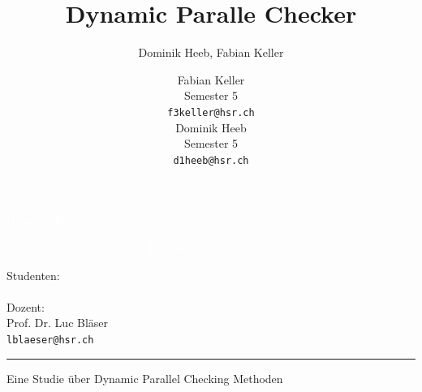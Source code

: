 \documentclass[10pt,a4paper]{article}
\author{Dominik Heeb, Fabian Keller}
\title{Dynamic Paralle Checker}
\author{%
    Fabian Keller \\
    Semester 5 \\
    \texttt{f3keller@hsr.ch}\vspace{15pt} \\
    Dominik Heeb \\
    Semester 5 \\
    \texttt{d1heeb@hsr.ch}
    }
\makeatletter
\def\printauthor{%
    {\LARGE Studenten:\\\vspace{10pt}
    \large \@author \\\vspace{20pt}
    \LARGE Dozent:\\\vspace{10pt}
    \large Prof. Dr. Luc Bläser \\
	\texttt{lblaeser@hsr.ch}}}
\makeatother
\begin{document}
\begin{titlepage}
\BgThispage
{}
\vspace*{2cm}
\noindent
\textcolor{white}{\bigsf Dynamic Parallel Checker\\[0.5cm] \begin{huge}Semesterarbeit - Technische Dokumentation\end{huge}}
\vspace*{2.0cm}\par
\noindent
\begin{minipage}{0.35\linewidth}
    \begin{flushright}
        \printauthor
    \end{flushright}
\end{minipage} \hspace{15pt}
%
\begin{minipage}{0.02\linewidth}
    \rule{1pt}{300pt}
\end{minipage} \hspace{40pt}
%
\begin{minipage}{0.6\linewidth}
\begin{center}
\begin{huge}
Eine Studie über Dynamic Parallel Checking Methoden
\end{huge}
\end{center}
\end{minipage}
\end{titlepage}
\restoregeometry

\newpage
\tableofcontents 
\newpage
\end{document}
